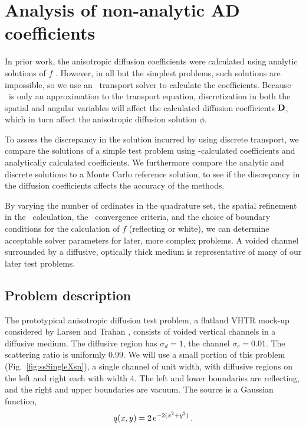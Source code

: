 \section{Analysis of non-analytic AD coefficients}

In prior work, the anisotropic diffusion coefficients were calculated using
analytic solutions of $f$ \cite{Lar2009c}. However, in all but the simplest
problems, such solutions are impossible, so we use an \SN\ transport solver to
calculate the coefficients. Because \SN\ is only an approximation to the
transport equation, discretization in both the spatial and angular variables
will affect the calculated diffusion coefficients $\mathbf{D}$, which in turn affect
the anisotropic diffusion solution $\phi$.

To assess the discrepancy in the solution incurred by using discrete transport,
we compare the solutions of a simple test problem using \SN-calculated
coefficients and analytically calculated coefficients.  We furthermore compare
the analytic and discrete solutions to a Monte Carlo reference solution, to see
if the discrepancy in the diffusion coefficients affects the accuracy of
the methods.

By varying the number of ordinates in the quadrature set, the spatial
refinement in the \SN\ calculation, the \SN\ convergence criteria, and the
choice of boundary conditions for the calculation of $f$ (reflecting or white),
we can determine acceptable solver parameters for later, more complex
problems.  A
voided channel surrounded by a diffusive, optically thick medium is
representative of many of our later test problems.

\subsection{Problem description}

The prototypical anisotropic diffusion test problem, a flatland VHTR mock-up
considered by Larsen and Trahan \cite{Lar2009c}, consists of voided vertical channels in a
diffusive medium. The diffusive region has $\sigma_d=1$, the channel
$\sigma_c=0.01$. The scattering ratio is uniformly $0.99$.  We will use a small
portion of this problem (Fig.~\ref{fig:ssSingleXsn}), a single channel of unit
width, with diffusive regions on the left and right each with width 4. The left
and lower boundaries are reflecting, and the right and upper boundaries are
vacuum. The source is a Gaussian function,
\begin{equation*}
  q(x,y) = 2 \mathop{}\!\mathrm{e}^{-2 (x^2 + y^2)}\,.
\end{equation*}

